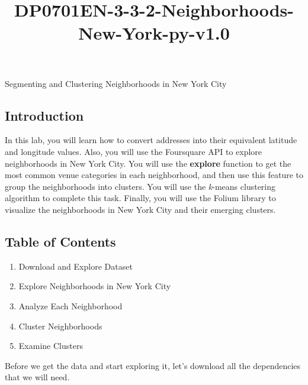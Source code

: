 \documentclass[11pt]{article}
\title{DP0701EN-3-3-2-Neighborhoods-New-York-py-v1.0}
\begin{document}
    
    \maketitle
    
    

    
    Segmenting and Clustering Neighborhoods in New York City

    \hypertarget{introduction}{%
\subsection{Introduction}\label{introduction}}

In this lab, you will learn how to convert addresses into their
equivalent latitude and longitude values. Also, you will use the
Foursquare API to explore neighborhoods in New York City. You will use
the \textbf{explore} function to get the most common venue categories in
each neighborhood, and then use this feature to group the neighborhoods
into clusters. You will use the \emph{k}-means clustering algorithm to
complete this task. Finally, you will use the Folium library to
visualize the neighborhoods in New York City and their emerging
clusters.

    \hypertarget{table-of-contents}{%
\subsection{Table of Contents}\label{table-of-contents}}

\begin{enumerate}
\def\labelenumi{\arabic{enumi}.}
\item
  Download and Explore Dataset
\item
  Explore Neighborhoods in New York City
\item
  Analyze Each Neighborhood
\item
  Cluster Neighborhoods
\item
  Examine Clusters\\
\end{enumerate}

    Before we get the data and start exploring it, let's download all the
dependencies that we will need.
\end{document}
